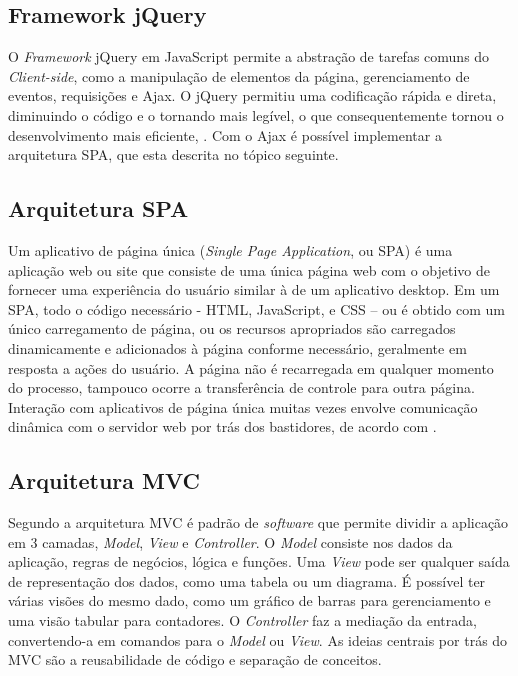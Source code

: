 \subsection{Framework {j}Query}
O \textit{Framework} jQuery em JavaScript permite a abstração de tarefas comuns do \textit{Client-side}, como a manipulação de elementos da página, gerenciamento de eventos, requisições e Ajax. O jQuery permitiu uma codificação rápida e direta, diminuindo o código e o tornando mais legível, o que consequentemente tornou o desenvolvimento mais eficiente, \cite{duckett2018javascript}. Com o Ajax é possível implementar a arquitetura SPA, que esta descrita no tópico seguinte.

\subsection{Arquitetura SPA}
Um aplicativo de página única (\textit{Single Page Application}, ou SPA) é uma aplicação web ou site que consiste de uma única página web com o objetivo de fornecer uma experiência do usuário similar à de um aplicativo desktop. Em um SPA, todo o código necessário - HTML, JavaScript, e CSS – ou é obtido com um único carregamento de página, ou os recursos apropriados são carregados dinamicamente e adicionados à página conforme necessário, geralmente em resposta a ações do usuário. A página não é recarregada em qualquer momento do processo, tampouco ocorre a transferência de controle para outra página. Interação com aplicativos de página única muitas vezes envolve comunicação dinâmica com o servidor web por trás dos bastidores, de acordo com .

\subsection{Arquitetura MVC}
Segundo  a arquitetura MVC é padrão de \textit{software} que permite dividir a aplicação em 3 camadas, \textit{Model}, \textit{View} e \textit{Controller}. O \textit{Model} consiste nos dados da aplicação, regras de negócios, lógica e funções. Uma \textit{View} pode ser qualquer saída de representação dos dados, como uma tabela ou um diagrama. É possível ter várias visões do mesmo dado, como um gráfico de barras para gerenciamento e uma visão tabular para contadores. O \textit{Controller} faz a mediação da entrada, convertendo-a em comandos para o \textit{Model} ou \textit{View}. As ideias centrais por trás do MVC são a reusabilidade de código e separação de conceitos.

